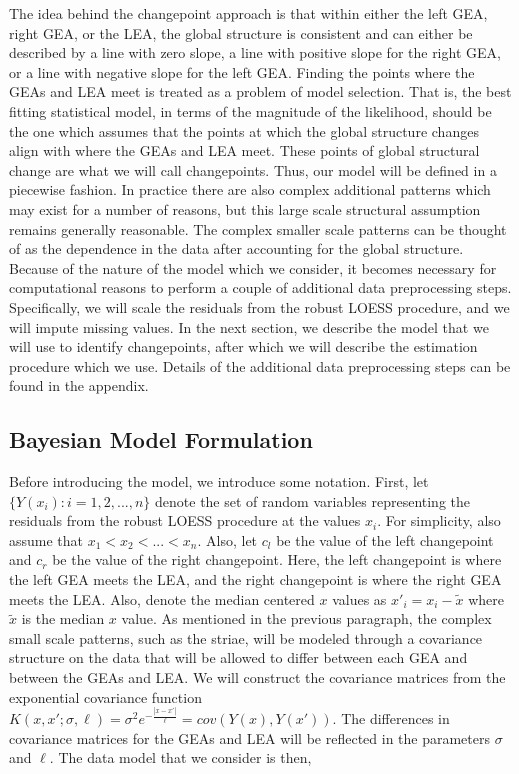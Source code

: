 \documentclass[12pt]{article}
\begin{document}
The idea behind the changepoint approach is that within either the left
GEA, right GEA, or the LEA, the global structure is consistent and can
either be described by a line with zero slope, a line with positive
slope for the right GEA, or a line with negative slope for the left GEA.
Finding the points where the GEAs and LEA meet is treated as a problem
of model selection. That is, the best fitting statistical model, in
terms of the magnitude of the likelihood, should be the one which
assumes that the points at which the global structure changes align with
where the GEAs and LEA meet. These points of global structural change
are what we will call changepoints. Thus, our model will be defined in a
piecewise fashion. In practice there are also complex additional
patterns which may exist for a number of reasons, but this large scale
structural assumption remains generally reasonable. The complex smaller
scale patterns can be thought of as the dependence in the data after
accounting for the global structure. Because of the nature of the model
which we consider, it becomes necessary for computational reasons to
perform a couple of additional data preprocessing steps. Specifically,
we will scale the residuals from the robust LOESS procedure, and we will
impute missing values. In the next section, we describe the model that
we will use to identify changepoints, after which we will describe the
estimation procedure which we use. Details of the additional data
preprocessing steps can be found in the appendix.

\subsection{Bayesian Model Formulation}

Before introducing the model, we introduce some notation. First, let
\(\{Y(x_i): i = 1,2, ..., n\}\) denote the set of random variables
representing the residuals from the robust LOESS procedure at the values
\(x_i\). For simplicity, also assume that \(x_1 < x_2 < ... < x_n\).
Also, let \(c_l\) be the value of the left changepoint and \(c_r\) be
the value of the right changepoint. Here, the left changepoint is where
the left GEA meets the LEA, and the right changepoint is where the right
GEA meets the LEA. Also, denote the median centered \(x\) values as
\(x'_i = x_i - \tilde{x}\) where \(\tilde{x}\) is the median \(x\)
value. As mentioned in the previous paragraph, the complex small scale
patterns, such as the striae, will be modeled through a covariance
structure on the data that will be allowed to differ between each GEA
and between the GEAs and LEA. We will construct the covariance matrices
from the exponential covariance function
\(K(x, x';\sigma, \ell) = \sigma^2 e^{-\frac{|x - x'|}{\ell}} = cov(Y(x), Y(x'))\).
The differences in covariance matrices for the GEAs and LEA will be
reflected in the parameters \(\sigma\) and \(\ell\). The data model that
we consider is then,
\end{document}
